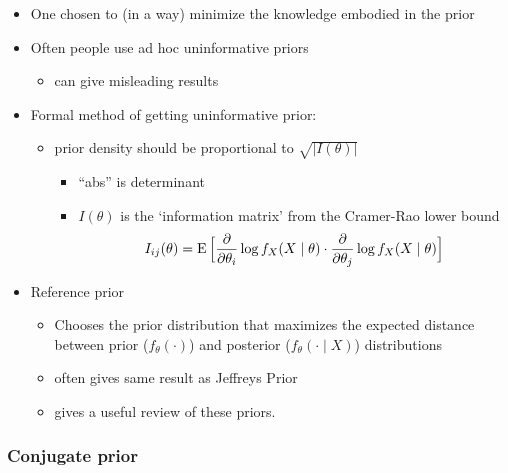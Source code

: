 \begin{itemize}[leftmargin=0pt]
\item One chosen to (in a way) minimize the knowledge embodied in
       the prior
\item Often people use ad hoc uninformative priors
\begin{itemize}
\item can give misleading results
\end{itemize}
\item Formal method of getting uninformative prior:
\begin{itemize}
\item prior density should be proportional to $\sqrt{|I(\theta)|}$
\begin{itemize}
\item ``abs'' is determinant
\item $I(\theta)$ is the `information matrix' from the Cramer-Rao lower bound
  \[I_{ij}(\theta) = \operatorname{E}\Big[ \frac{\partial}{\partial \theta_i} \log f_X(X \mid \theta) \cdot \frac{\partial}{\partial \theta_j}
  \log f_X(X \mid \theta) \Big]\]
\end{itemize}
\end{itemize}
\item Reference prior
\begin{itemize}
\item Chooses the prior distribution that maximizes the expected
  distance between prior ($f_\theta(\cdot)$) and posterior ($f_\theta(\cdot \mid X)$)
  distributions
\item often gives same result as Jeffreys Prior
\item \citet{Ber05} gives a useful review of these priors.
\end{itemize}
\end{itemize}

\subsubsection{Conjugate prior}

